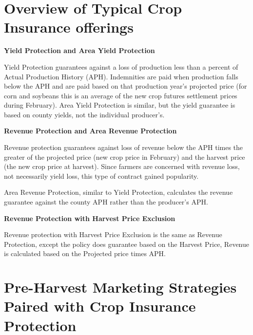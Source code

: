 \documentclass[
  letterpaper,
  DIV=11,
  numbers=noendperiod]{scrreprt}
\begin{document}
\hypertarget{overview-of-typical-crop-insurance-offerings}{%
\section{Overview of Typical Crop Insurance
offerings}\label{overview-of-typical-crop-insurance-offerings}}

\textbf{Yield Protection and Area Yield Protection}

Yield Protection guarantees against a loss of production less than a
percent of Actual Production History (APH). Indemnities are paid when
production falls below the APH and are paid based on that production
year's projected price (for corn and soybeans this is an average of the
new crop futures settlement prices during February). Area Yield
Protection is similar, but the yield guarantee is based on county
yields, not the individual producer's.

\textbf{Revenue Protection and Area Revenue Protection}

Revenue protection guarantees against loss of revenue below the APH
times the greater of the projected price (new crop price in February)
and the harvest price (the new crop price at harvest). Since farmers are
concerned with revenue loss, not necessarily yield loss, this type of
contract gained popularity.

Area Revenue Protection, similar to Yield Protection, calculates the
revenue guarantee against the county APH rather than the producer's APH.

\textbf{Revenue Protection with Harvest Price Exclusion}

Revenue protection with Harvest Price Exclusion is the same as Revenue
Protection, except the policy does guarantee based on the Harvest Price,
Revenue is calculated based on the Projected price times APH.

\hypertarget{pre-harvest-marketing-strategies-paired-with-crop-insurance-protection}{%
\section{Pre-Harvest Marketing Strategies Paired with Crop Insurance
Protection}\label{pre-harvest-marketing-strategies-paired-with-crop-insurance-protection}}
\end{document}
